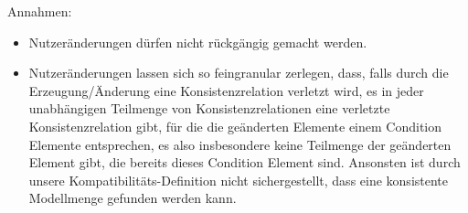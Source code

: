 







Annahmen:
\begin{itemize}
    \item Nutzeränderungen dürfen nicht rückgängig gemacht werden.
    \item Nutzeränderungen lassen sich so feingranular zerlegen, dass, falls durch die Erzeugung/Änderung eine Konsistenzrelation verletzt wird, es in jeder unabhängigen Teilmenge von Konsistenzrelationen eine verletzte Konsistenzrelation gibt, für die die geänderten Elemente einem Condition Elemente entsprechen, es also insbesondere keine Teilmenge der geänderten Element gibt, die bereits dieses Condition Element sind. Ansonsten ist durch unsere Kompatibilitäts-Definition nicht sichergestellt, dass eine konsistente Modellmenge gefunden werden kann.
\end{itemize}




